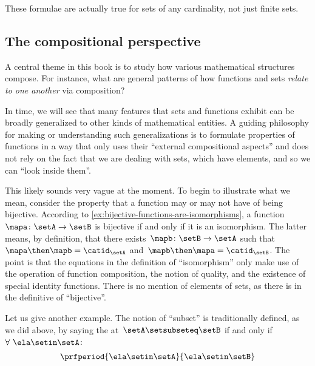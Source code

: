 These formulae are actually true for sets of any cardinality, not just finite sets.

\subsection{The compositional perspective}

A central theme in this book is to study how various mathematical structures compose.
For instance, what are general patterns of how functions and sets \emph{relate to one another} via composition?

In time, we will see that many features that sets and functions exhibit can be broadly generalized to other kinds of mathematical entities.
A guiding philosophy for making or understanding such generalizations is to formulate properties of functions in a way that only uses their ``external compositional aspects'' and does not rely on the fact that we are dealing with sets, which have elements, and so we can ``look inside them''.

This likely sounds very vague at the moment.
To begin to illustrate what we mean, consider the property that a function may or may not have of being bijective.
According to \cref{ex:bijective-functions-are-isomorphisms}, a function~$\mapa\colon \setA \to \setB$ is bijective if and only if it is an isomorphism.
The latter means, by definition, that there exists~$\mapb \colon \setB \to \setA$ such that~$\mapa \then \mapb = \catid_\setA$ and~$\mapb \then \mapa = \catid_\setB$.
The point is that the equations in the definition of ``isomorphism'' only make use of the operation of function composition, the notion of quality, and the existence of special identity functions.
There is no mention of elements of sets, as there is in the definitive of ``bijective''.

Let us give another example.
The notion of ``subset'' is traditionally defined, as we did above, by saying the at~$\setA \setsubseteq \setB$ if and only if~$\forall \ \ela \setin\setA$:
\begin{equation*}
    \prfperiod{
        \ela \setin\setA
    }{
        \ela \setin\setB
    }
\end{equation*}

